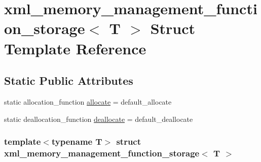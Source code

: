 \hypertarget{structxml__memory__management__function__storage}{
\section{xml\_\-memory\_\-management\_\-function\_\-storage$<$ T $>$ Struct Template Reference}
\label{structxml__memory__management__function__storage}
}
\subsection*{Static Public Attributes}
\begin{DoxyCompactItemize}
\item 
static allocation\_\-function \hyperlink{structxml__memory__management__function__storage_abb6865f8d07d27fd9273737c59f6e941}{allocate} = default\_\-allocate
\item 
static deallocation\_\-function \hyperlink{structxml__memory__management__function__storage_a1c80a9a045ed6cfb90b17a178e4b3512}{deallocate} = default\_\-deallocate
\end{DoxyCompactItemize}
\subsubsection*{template$<$typename T$>$ struct xml\_\-memory\_\-management\_\-function\_\-storage$<$ T $>$}



